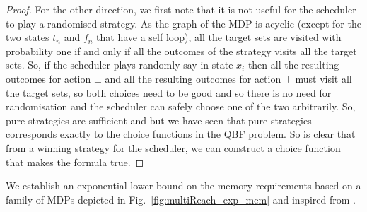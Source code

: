 \documentclass{llncs}
\begin{document}
\begin{proof}
  For the other direction, we first note that it is not useful for the scheduler to play a randomised strategy. As the graph of the MDP is acyclic (except for the two states $t_n$ and $f_n$ that have a self loop), all the target sets are visited with probability one if and only if all the outcomes of the strategy visits all the target sets. So, if the scheduler plays randomly say in state $x_i$ then all the resulting outcomes for action $\bot$ and all the resulting outcomes for action $\top$ must visit all the target sets, so both choices need to be good and so there is no need for randomisation and the scheduler can safely choose one of the two arbitrarily. So, pure strategies are sufficient and but we have seen that pure strategies corresponds exactly to the choice functions in the QBF problem. So is clear that from a winning strategy for the scheduler, we can construct a choice function that makes the formula true.
  \end{proof}


We establish an exponential lower bound on the memory requirements based on a family of MDPs depicted in Fig.~\ref{fig:multiReach_exp_mem} and inspired from \cite[Lemma 8]{DBLP:journals/acta/ChatterjeeRR14}.
\end{document}
